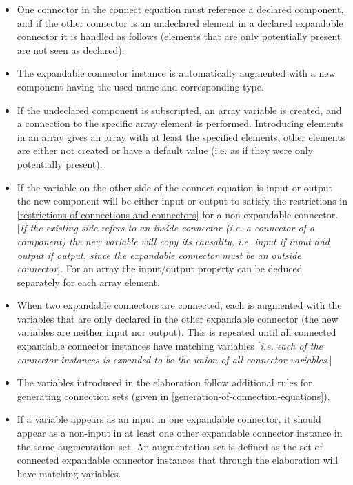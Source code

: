 \documentclass[10pt,a4paper]{report}
\begin{document}
\begin{itemize}
\item
  One connector in the connect equation must reference a declared
  component, and if the other connector is an undeclared element in a
  declared expandable connector it is handled as follows (elements that
  are only potentially present are not seen as declared):
\item
  The expandable connector instance is automatically augmented with a
  new component having the used name and corresponding type.
\item
  If the undeclared component is subscripted, an array variable is
  created, and a connection to the specific array element is performed.
  Introducing elements in an array gives an array with at least the
  specified elements, other elements are either not created or have a
  default value (i.e. as if they were only potentially present).
\item
  If the variable on the other side of the connect-equation is input or
  output the new component will be either input or output to satisfy the
  restrictions in \ref{restrictions-of-connections-and-connectors} for a non-expandable connector.
  {[}\emph{If the existing side refers to an inside connector (i.e. a
  connector of a component) the new variable will copy its causality,
  i.e. input if input and output if output, since the expandable
  connector must be an outside connector}{]}. For an array the
  input/output property can be deduced separately for each array
  element.
\item
  When two expandable connectors are connected, each is augmented with
  the variables that are only declared in the other expandable connector
  (the new variables are neither input nor output). This is repeated
  until all connected expandable connector instances have matching
  variables {[}\emph{i.e. each of the connector instances is expanded to
  be the union of all connector variables}.{]}
\item
  The variables introduced in the elaboration follow additional rules
  for generating connection sets (given in \ref{generation-of-connection-equations}).
\item
  If a variable appears as an input in one expandable connector, it
  should appear as a non-input in at least one other expandable
  connector instance in the same augmentation set. An augmentation set
  is defined as the set of connected expandable connector instances that
  through the elaboration will have matching variables.


\end{itemize}
\end{document}
